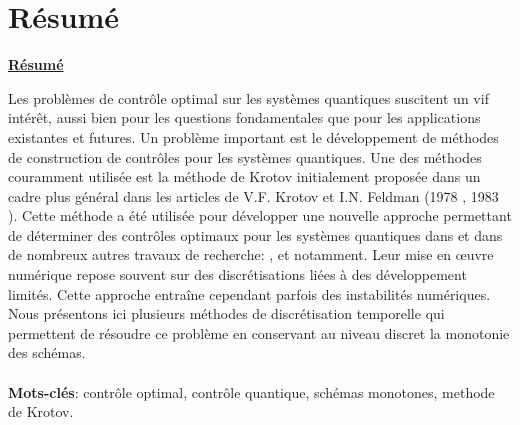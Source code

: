 \chapter*{Résumé}
\Large
\begin{flushleft}
\textbf{\underline{Résumé}}
\end{flushleft}
\normalsize
Les problèmes de contrôle optimal sur les systèmes quantiques suscitent un vif intérêt, aussi bien pour les questions fondamentales que pour les applications existantes et futures. Un problème important est le développement de méthodes de construction de contrôles pour les systèmes quantiques. Une des méthodes couramment utilisée est la méthode de Krotov initialement proposée dans un cadre plus général dans les articles de V.F. Krotov et I.N. Feldman (1978 \cite{Krotov1}, 1983 \cite{Krotov2}). Cette méthode a été utilisée pour développer une nouvelle approche permettant de déterminer des contrôles optimaux pour les systèmes quantiques dans \cite{Tannor} et dans de nombreux autres travaux de recherche: \cite{Zhu}, \cite{Maday} et \cite{Salomon} notamment. Leur mise en œuvre numérique repose souvent sur des discrétisations liées à des développement limités. Cette approche entraîne cependant parfois des instabilités numériques. Nous présentons ici plusieurs méthodes de discrétisation temporelle qui permettent de résoudre ce problème en conservant au niveau discret la monotonie des schémas.\\\\
\textbf{Mots-clés}:  contrôle optimal, contrôle quantique, schémas monotones, methode de Krotov.